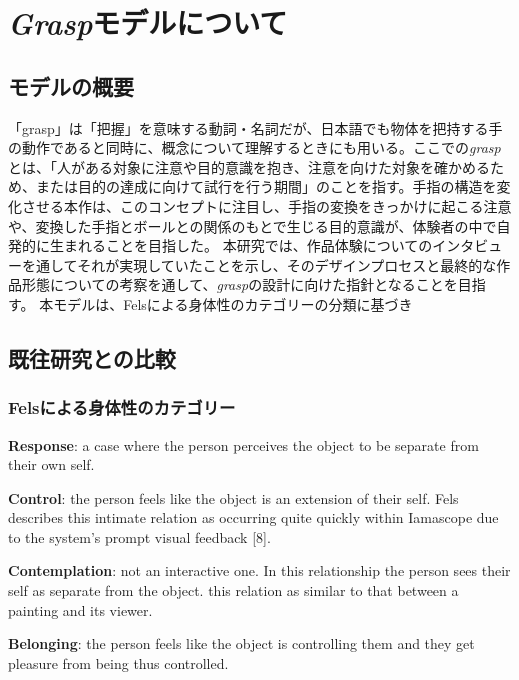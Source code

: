\chapter{\textit{Grasp}モデルについて}

\section{モデルの概要}
「grasp」は「把握」を意味する動詞・名詞だが、日本語でも物体を把持する手の動作であると同時に、概念について理解するときにも用いる。ここでの\textit{grasp}とは、「人がある対象に注意や目的意識を抱き、注意を向けた対象を確かめるため、または目的の達成に向けて試行を行う期間」のことを指す。手指の構造を変化させる本作は、このコンセプトに注目し、手指の変換をきっかけに起こる注意や、変換した手指とボールとの関係のもとで生じる目的意識が、体験者の中で自発的に生まれることを目指した。
本研究では、作品体験についてのインタビューを通してそれが実現していたことを示し、そのデザインプロセスと最終的な作品形態についての考察を通して、\textit{grasp}の設計に向けた指針となることを目指す。
本モデルは、Felsによる身体性のカテゴリーの分類に基づき

\section{既往研究との比較}
\subsection{Felsによる身体性のカテゴリー}
\textbf{Response}: a case where the person perceives the object to be separate from their own self. 

\textbf{Control}: the person feels like the object is an extension of their self. Fels describes this intimate
relation as occurring quite quickly within Iamascope due to the system’s prompt visual feedback [8].

\textbf{Contemplation}: not an interactive one. In this relationship the person sees their self as separate from the object. this relation as similar to that between a painting and its viewer.

\textbf{Belonging}: the person feels like the object is controlling them and they get pleasure from being thus controlled.